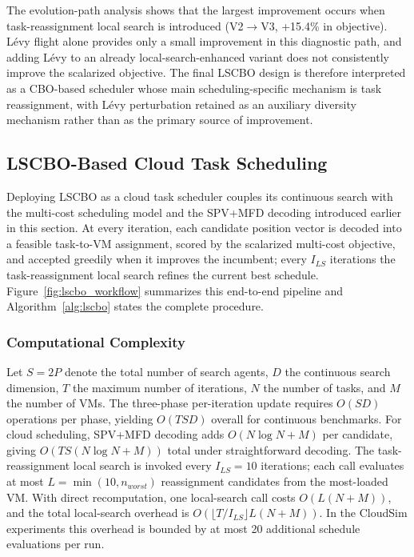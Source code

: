 \documentclass[pdflatex,onecolumn,sn-mathphys-num]{sn-jnl}
\begin{document}
The evolution-path analysis shows that the largest improvement occurs when task-reassignment local search is introduced (V2$\rightarrow$V3, +15.4\% in objective). L\'{e}vy flight alone provides only a small improvement in this diagnostic path, and adding L\'{e}vy to an already local-search-enhanced variant does not consistently improve the scalarized objective. The final LSCBO design is therefore interpreted as a CBO-based scheduler whose main scheduling-specific mechanism is task reassignment, with L\'{e}vy perturbation retained as an auxiliary diversity mechanism rather than as the primary source of improvement.

\subsection{LSCBO-Based Cloud Task Scheduling}\label{sec:lscbo_scheduling}
Deploying LSCBO as a cloud task scheduler couples its continuous search with the multi-cost scheduling model and the SPV+MFD decoding introduced earlier in this section. At every iteration, each candidate position vector is decoded into a feasible task-to-VM assignment, scored by the scalarized multi-cost objective, and accepted greedily when it improves the incumbent; every $I_{LS}$ iterations the task-reassignment local search refines the current best schedule. Figure~\ref{fig:lscbo_workflow} summarizes this end-to-end pipeline and Algorithm~\ref{alg:lscbo} states the complete procedure.

\subsubsection{Computational Complexity}
Let $S=2P$ denote the total number of search agents, $D$ the continuous search dimension, $T$ the maximum number of iterations, $N$ the number of tasks, and $M$ the number of VMs. The three-phase per-iteration update requires $O(SD)$ operations per phase, yielding $O(TSD)$ overall for continuous benchmarks. For cloud scheduling, SPV+MFD decoding adds $O(N\log N + M)$ per candidate, giving $O(TS(N\log N + M))$ total under straightforward decoding. The task-reassignment local search is invoked every $I_{LS}=10$ iterations; each call evaluates at most $L=\min(10,n_{worst})$ reassignment candidates from the most-loaded VM. With direct recomputation, one local-search call costs $O(L(N+M))$, and the total local-search overhead is $O(\lfloor T/I_{LS}\rfloor L(N+M))$. In the CloudSim experiments this overhead is bounded by at most 20 additional schedule evaluations per run.
\end{document}
